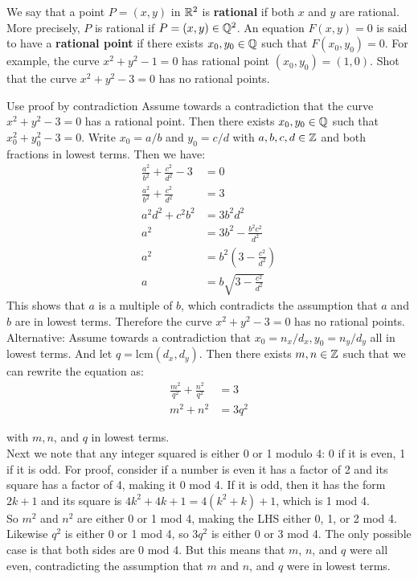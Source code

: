 \documentclass{article}
\begin{document}
\begin{problem}
    We say that a point $P = (x,y)$ in $\mathbb{R}^2$ is \textbf{rational} if both $x$ and $y$ are rational. More precisely, $P$ is rational if $P = (x, y) \in \mathbb{Q}^2$. An equation $F(x,y)=0$ is said to have a \textbf{rational point} if there exists $x_0, y_0 \in \mathbb{Q}$ such that $F(x_0, y_0) = 0$. For example, the curve $x^2 + y^2 - 1 = 0$ has rational point $(x_0, y_0)=(1,0).$ Shot that the curve $x^2 + y^2 - 3 = 0$ has no rational points.
\end{problem}
\begin{solution}{Use proof by contradiction}
    Assume towards a contradiction that the curve $x^2 + y^2 - 3 = 0$ has a rational point. Then there exists $x_0, y_0 \in \mathbb{Q}$ such that $x_0^2 + y_0^2 - 3 = 0$. Write $x_0 = a/b$ and $y_0 = c/d$ with $a, b, c, d \in \mathbb{Z}$ and both fractions in lowest terms. Then we have:
    \begin{align*}
        \frac{a^2}{b^2} + \frac{c^2}{d^2} - 3 &= 0 \\
        \frac{a^2}{b^2} + \frac{c^2}{d^2} &= 3\\
        a^2d^2 + c^2b^2 &= 3b^2d^2 \\
        a^2 &= 3b^2 - \frac{b^2 c^2}{d^2}\\
        a^2 &= b^2\left(3 - \frac{c^2}{d^2}\right) \\
        a &= b\sqrt{3 - \frac{c^2}{d^2}}
    \end{align*}
    This shows that $a$ is a multiple of $b$, which contradicts the assumption that $a$ and $b$ are in lowest terms. Therefore the curve $x^2 + y^2 - 3 = 0$ has no rational points.
    \\

    Alternative: Assume towards a contradiction that $x_0 = n_x/d_x, y_0 = n_y/d_y$ all in lowest terms. And let $q = \text{lcm}(d_x, d_y)$. Then there exists $m, n \in \mathbb{Z}$ such that we can rewrite the equation as:
    \begin{align*}
    \frac{m^2}{q^2} + \frac{n^2}{q^2} &= 3\\
    m^2 + n^2 &= 3q^2
    \end{align*}

    with $m, n$, and $q$ in lowest terms.
    \\
    Next we note that any integer squared is either 0 or 1 modulo 4: 0 if it is even, 1 if it is odd. For proof, consider if a number is even it has a factor of 2 and its square has a factor of 4, making it 0 mod 4. If it is odd, then it has the form $2k + 1$ and its square is $4k^2 + 4k + 1 = 4(k^2 + k) + 1$, which is 1 mod 4.\\

    So $m^2$ and $n^2$ are either 0 or 1 mod 4, making the LHS either 0, 1, or 2 mod 4. Likewise $q^2$ is either 0 or 1 mod 4, so $3q^2$ is either 0 or 3 mod 4. The only possible case is that both sides are 0 mod 4. But this means that $m$, $n$, and $q$ were all even, contradicting the assumption that $m$ and $n$, and $q$ were in lowest terms.

\end{solution}
\end{document}
